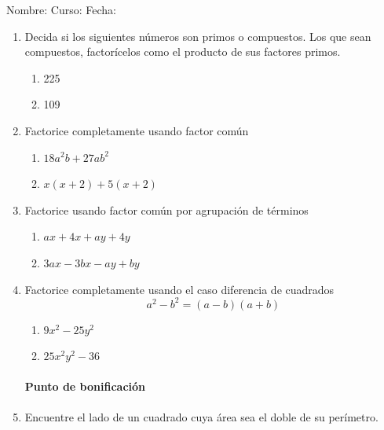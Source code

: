 \documentclass[letterpaper,fleqn]{article}
\newcommand{\LineaNombre}{%
\par
\vspace{\baselineskip}
Nombre:\hrulefill \; Curso: \underline{\hspace*{48pt}} \; Fecha: \underline{\hspace*{2.5cm}} \relax
\par}
\begin{document}
\LineaNombre
\begin{enumerate}
 \item Decida si los siguientes números son primos o compuestos. Los que sean compuestos, factorícelos como el producto de sus factores primos.
 \begin{enumerate}
 \item 225\noanswer
 \item 109 \noanswer
 \end{enumerate}
 \item Factorice completamente usando factor común
 \begin{enumerate}
 \item $18a^{2}b+27ab^{2}$\noanswer
 \item $x(x+2)+5(x+2)$\noanswer
 \end{enumerate}
 \item Factorice usando factor común por agrupación de términos
 \begin{enumerate}
 \item $ax+4x+ay+4y$\noanswer
 \item $3ax-3bx-ay+by$\noanswer
 \end{enumerate}
 \item Factorice completamente usando el caso diferencia de cuadrados \[a^{2}-b^{2}=(a-b)(a+b)\]
\begin{enumerate}
\item $9x^{2}-25y^{2}$\noanswer
\item $25x^{2}y^{2}-36$\noanswer
\end{enumerate}
\paragraph{Punto de bonificación}
\item Encuentre el lado de un cuadrado cuya área sea el doble de su perímetro.
 \end{enumerate}
\end{document}
